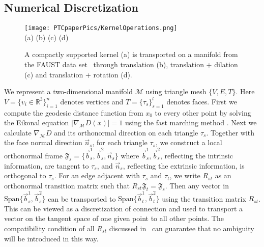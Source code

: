 \documentclass[10pt,twocolumn,letterpaper]{article}
\def\M{\mathcal{M}}
\def\RR{\mathbb{R}}
\def\vb{\vec{b}}
\def\vn{\vec{n}}
\begin{document}
\subsection{Numerical Discretization}
\begin{figure}
 \centering
\texttt{[image: PTCpaperPics/KernelOperations.png]}\\{\centering (a)\hspace{1.7cm} (b) \hspace{1.7cm} (c) \hspace{1.7cm} (d)}
\caption{A compactly supported kernel (a) is transported on a manifold from the FAUST data set~\cite{bogo2014faust} through translation (b), translation + dilation (c) and translation + rotation (d).}
  \label{fig:ConvKernel}
\end{figure} 
We represent a two-dimensional manifold $\M$ using triangle mesh $\{V, E, T\}$. Here $V = \{v_i \in \RR^3\}_{i=1}^n$ denotes vertices and $T = \{\tau_s \}_{s=1}^l$ denotes faces. First we compute the geodesic distance function from $x_0$ to every other point by solving the Eikonal equation $|\nabla_\M D(x) | = 1$ using the fast marching method \cite{sethian1996fast,kimmel1998computing}. Next we calculate $\nabla_\M D$ and its orthonormal direction on each triangle $\tau_s$. Together with the face normal direction $\vn_{s}$,
for each triangle $\tau_s$, we construct a local orthonormal frame $\mathfrak{F}_s = \{\vb_{s}^1,\vb_{s}^2,\vn_{s}\}$ where $\vb_{s}^1,\vb_{s}^2$, reflecting the intrinsic information, are tangent to $\tau_s$,  and $\vn_{s}$, reflecting the extrinsic information, is orthogonal to $\tau_s$. For an edge adjacent with $\tau_s$ and $\tau_t$, we write $R_{st}$ as an orthonormal transition matrix such that $R_{st}\mathfrak{F}_t = \mathfrak{F}_s$. Then any vector in $\mathrm{Span}\{\vb_{s}^1,\vb_{s}^2\}$ can be transported to $\mathrm{Span}\{\vb_{t}^1,\vb_{t}^2\}$ using the transition matrix $R_{st}$. This can be viewed as a discretization of connection and used to transport a vector on the tangent space of one given point to all other points.
The compatibility condition of all $R_{st}$ discussed in~\cite{wang2012linear} can guarantee  that no ambiguity will be introduced in this way.
\end{document}
